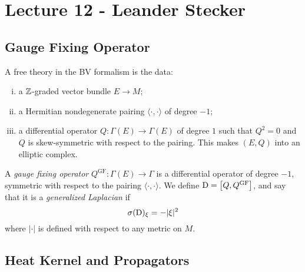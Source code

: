 \chapter{Lecture 12 - Leander Stecker}

\section{Gauge Fixing Operator}

\begin{definition}
  A free theory in the BV formalism is the data:
  \begin{enumerate}[i)]
    \item a $\mathbb{Z}$-graded vector bundle $E \to M$;
    \item a Hermitian nondegenerate pairing $\langle \cdot, \cdot \rangle$ of degree $-1$;
    \item a differential operator $Q \colon \Gamma(E) \to \Gamma(E)$ of degree $1$ such that $Q^2 = 0$ and $Q$ is skew-symmetric with respect to the pairing.
          This makes $(E, Q)$ into an elliptic complex.
  \end{enumerate}
\end{definition}

\begin{definition}
  A \textit{gauge fixing operator} $Q^\text{GF} \colon \Gamma(E) \to \Gamma$ is a differential operator of degree $-1$, symmetric with respect to the pairing $\langle \cdot, \cdot \rangle$.
  We define $\mathrm{D} = \bigl[Q, Q^\text{GF}\bigr]$, and say that it is a \textit{generalized Laplacian} if
  \begin{equation*}
    \sigma(\mathrm{D})_\xi = - |\xi|^2
  \end{equation*}
  where $|\cdot|$ is defined with respect to any metric on $M$.
\end{definition}

\section{Heat Kernel and Propagators}

